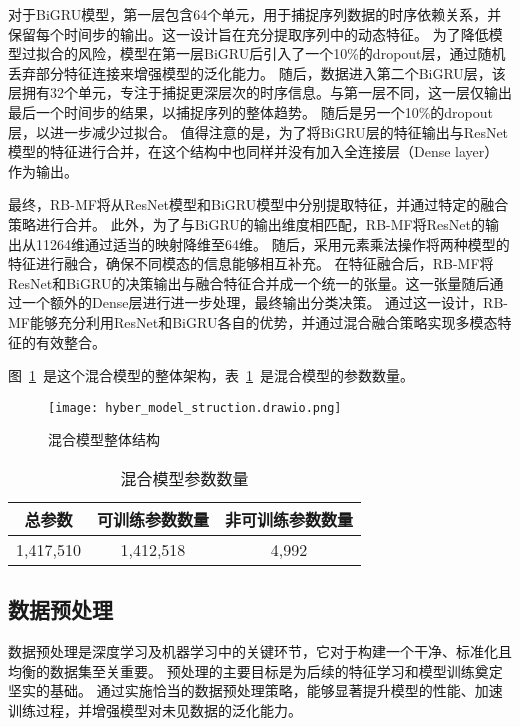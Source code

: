 对于BiGRU模型，第一层包含64个单元，用于捕捉序列数据的时序依赖关系，并保留每个时间步的输出。这一设计旨在充分提取序列中的动态特征。
为了降低模型过拟合的风险，模型在第一层BiGRU后引入了一个10\%的dropout层，通过随机丢弃部分特征连接来增强模型的泛化能力。
随后，数据进入第二个BiGRU层，该层拥有32个单元，专注于捕捉更深层次的时序信息。与第一层不同，这一层仅输出最后一个时间步的结果，以捕捉序列的整体趋势。
随后是另一个10\%的dropout层，以进一步减少过拟合。
值得注意的是，为了将BiGRU层的特征输出与ResNet模型的特征进行合并，在这个结构中也同样并没有加入全连接层（Dense layer）作为输出。\par


最终，RB-MF将从ResNet模型和BiGRU模型中分别提取特征，并通过特定的融合策略进行合并。
此外，为了与BiGRU的输出维度相匹配，RB-MF将ResNet的输出从11264维通过适当的映射降维至64维。
随后，采用元素乘法操作将两种模型的特征进行融合，确保不同模态的信息能够相互补充。
在特征融合后，RB-MF将ResNet和BiGRU的决策输出与融合特征合并成一个统一的张量。这一张量随后通过一个额外的Dense层进行进一步处理，最终输出分类决策。
通过这一设计，RB-MF能够充分利用ResNet和BiGRU各自的优势，并通过混合融合策略实现多模态特征的有效整合。

图~\ref{fig:hyber_model_struct}~是这个混合模型的整体架构，表~\ref{tab:model_params}~是混合模型的参数数量。
\begin{figure}[h]
	\centering
	\texttt{[image: hyber\_model\_struction.drawio.png]}
	\caption{混合模型整体结构}
	\label{fig:hyber_model_struct}
\end{figure}



\begin{table}[h]
	\caption{混合模型参数数量}
	\label{tab:model_params}
	\centering
	\begin{tabular}{ccc}
		\toprule
		\textbf{总参数} & \textbf{可训练参数数量} & \textbf{非可训练参数数量} \\
		\midrule
		1,417,510       & 1,412,518               & 4,992                     \\
		\bottomrule
	\end{tabular}
\end{table}
\subsection{数据预处理}
数据预处理是深度学习及机器学习中的关键环节，它对于构建一个干净、标准化且均衡的数据集至关重要。
预处理的主要目标是为后续的特征学习和模型训练奠定坚实的基础。
通过实施恰当的数据预处理策略，能够显著提升模型的性能、加速训练过程，并增强模型对未见数据的泛化能力。\par

